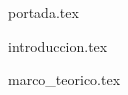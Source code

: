 \documentclass[a4paper, 12pt, twoside]{article}
\begin{document}
{portada.tex}

\tableofcontents

\clearpage


{introduccion.tex}

{marco_teorico.tex}

\clearpage

% 


\end{document}
